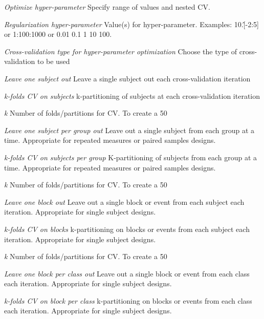 \textsl{Optimize hyper-parameter}
Specify range of values and nested CV.


\textit{Regularization hyper-parameter}
Value(s) for hyper-parameter. Examples: 10.\^[-2:5] or 1:100:1000 or 0.01 0.1 1 10 100.


\textit{Cross-validation type for hyper-parameter optimization}
Choose the type of cross-validation to be used


\textit{Leave one subject out}
Leave a single subject out each cross-validation iteration


\textit{k-folds CV on subjects}
k-partitioning of subjects at each cross-validation iteration


\textit{k}
Number of folds/partitions for CV. To create a 50%


\textit{Leave one subject per group out}
Leave out a single subject from each group at a time. Appropriate for repeated measures or paired samples designs.


\textit{k-folds CV on subjects per group}
K-partitioning of subjects from each group at a time. Appropriate for repeated measures or paired samples designs.


\textit{k}
Number of folds/partitions for CV. To create a 50%


\textit{Leave one block out}
Leave out a single block or event from each subject each iteration. Appropriate for single subject designs.


\textit{k-folds CV on blocks}
k-partitioning on blocks or events from each subject each iteration. Appropriate for single subject designs.


\textit{k}
Number of folds/partitions for CV. To create a 50%


\textit{Leave one block per class out}
Leave out a single block or event from each class each iteration. Appropriate for single subject designs.


\textit{k-folds CV on block per class}
k-partitioning on blocks or events from each class each iteration. Appropriate for single subject designs.


